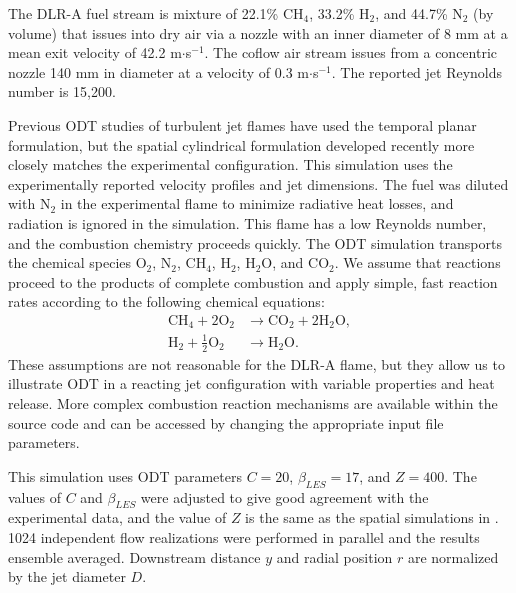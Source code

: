\documentclass[preprint,12pt, a4paper]{elsarticle}
\begin{document}
The DLR-A fuel stream is mixture of 22.1\% CH$_4$, 33.2\% H$_2$, and 44.7\% N$_2$ (by volume) that issues into dry air via a nozzle with an inner diameter of 8 mm at a mean exit velocity of 42.2 m$\cdot$s$^{-1}$. The coflow air stream issues from a concentric nozzle 140 mm in diameter at a velocity of 0.3 m$\cdot$s$^{-1}$. The reported jet Reynolds number is 15,200.

Previous ODT studies of turbulent jet flames have used the temporal planar formulation, but the spatial cylindrical formulation developed recently \cite{Lignell_2018} more closely matches the experimental configuration. This simulation uses the experimentally reported velocity profiles and jet dimensions.  
The fuel was diluted with N$_2$ in the experimental flame to minimize radiative heat losses, and radiation is ignored in the simulation. This flame has a low Reynolds number, and the combustion chemistry proceeds quickly. The ODT simulation transports the chemical species O$_2$, N$_2$, CH$_4$, H$_2$, H$_2$O, and CO$_2$. We assume that reactions proceed to the products of complete combustion and apply simple, fast reaction rates according to the following chemical equations:
\begin{align}
	\mathrm{CH}_4 + 2\mathrm{O}_2 & \rightarrow \mathrm{CO}_2 + 2\mathrm{H}_2\mathrm{O}, \\
	\mathrm{H}_2+\frac{1}{2}\mathrm{O}_2 & \rightarrow \mathrm{H}_2\mathrm{O}.
\end{align}
These assumptions are not reasonable for the DLR-A flame, but they allow us to illustrate ODT in a reacting jet configuration with variable properties and heat release. More complex combustion reaction mechanisms are available within the source code and can be accessed by changing the appropriate input file parameters. 

This simulation uses ODT parameters $C=20$, $\beta_{LES}=17$, and $Z=400$. The values of $C$ and $\beta_{LES}$ were adjusted to give good agreement with the experimental data, and the value of $Z$ is the same as the spatial simulations in \cite{Monson_2016}. 1024 independent flow realizations were performed in parallel and the results ensemble averaged. Downstream distance $y$ and radial position $r$ are normalized by the jet diameter $D$.
\end{document}
